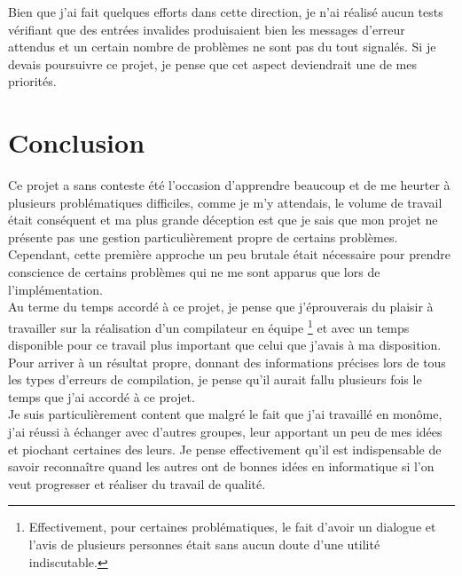 \documentclass[12pt]{article}
\begin{document}
Bien que j'ai fait quelques efforts dans cette direction, je n'ai réalisé aucun
tests vérifiant que des entrées invalides produisaient bien les messages
d'erreur attendus et un certain nombre de problèmes ne sont pas du tout
signalés. Si je devais poursuivre ce projet, je pense que cet aspect deviendrait
une de mes priorités.

\section{Conclusion}
Ce projet a sans conteste été l'occasion d'apprendre beaucoup et de me
heurter à plusieurs problématiques difficiles, comme je m'y attendais, le
volume de travail était conséquent et ma plus grande déception est que je
sais que mon projet ne présente pas une gestion particulièrement propre de
certains problèmes. Cependant, cette première approche un peu brutale était
nécessaire pour prendre conscience de certains problèmes qui ne me sont
apparus que lors de l'implémentation.\\

Au terme du temps accordé à ce projet, je pense que j'éprouverais du plaisir
à travailler sur la réalisation d'un compilateur en équipe
\footnote{Effectivement, pour certaines problématiques, le fait d'avoir un
dialogue et l'avis de plusieurs personnes était sans aucun doute d'une
utilité indiscutable.} et avec un temps disponible pour ce travail plus
important que celui que j'avais à ma disposition. Pour arriver à un résultat
propre, donnant des informations précises lors de tous les types d'erreurs
de compilation, je pense qu'il aurait fallu plusieurs fois le temps que j'ai
accordé à ce projet.\\

Je suis particulièrement content que malgré le fait que j'ai travaillé en
monôme, j'ai réussi à échanger avec d'autres groupes, leur apportant un peu
de mes idées et piochant certaines des leurs. Je pense effectivement qu'il
est indispensable de savoir reconnaître quand les autres ont de bonnes idées
en informatique si l'on veut progresser et réaliser du travail de qualité.
\end{document}
